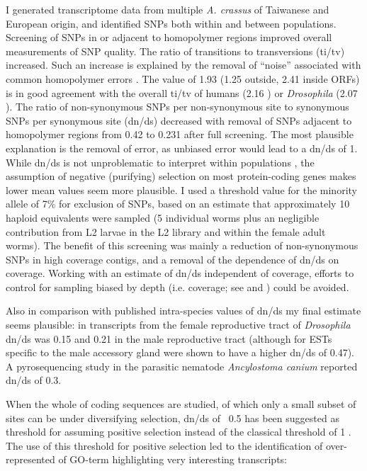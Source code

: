 I generated transcriptome data from multiple \textit{A. crassus} of
Taiwanese and European origin, and identified SNPs both within and
between populations. Screening of SNPs in or adjacent to homopolymer
regions improved overall measurements of SNP quality. The ratio of
transitions to transversions (ti/tv) increased. Such an increase is
explained by the removal of ``noise'' associated with common homopolymer
errors \cite{pmid21685085}. The value of 1.93 (1.25 outside, 2.41
inside ORFs) is in good agreement with the overall ti/tv of humans
(2.16 \cite{pmid21169219}) or \textit{Drosophila} (2.07
\cite{pmid21143862}). The ratio of non-synonymous SNPs per
non-synonymous site to synonymous SNPs per synonymous site (dn/ds)
decreased with removal of SNPs adjacent to homopolymer regions from
0.42 to 0.231 after full screening. The most plausible explanation is
the removal of error, as unbiased error would lead to a dn/ds of
1. While dn/ds is not unproblematic to interpret within populations
\cite{pmid19081788}, the assumption of negative (purifying) selection
on most protein-coding genes makes lower mean values seem more
plausible. I used a threshold value for the minority allele of 7\%
for exclusion of SNPs, based on an estimate that approximately 10
haploid equivalents were sampled (5 individual worms plus an
negligible contribution from L2 larvae in the L2 library and within
the female adult worms). The benefit of this screening was mainly a
reduction of non-synonymous SNPs in high coverage contigs, and a
removal of the dependence of dn/ds on coverage. Working with an
estimate of dn/ds independent of coverage, efforts to control for
sampling biased by depth (i.e. coverage; see \cite{pmid18590545} and
\cite{pmid20478048}) could be avoided.

Also in comparison with published intra-species values of dn/ds my
final estimate seems plausible: in transcripts from the female
reproductive tract of \textit{Drosophila} dn/ds was 0.15
\cite{pmid15579698} and 0.21 in the male reproductive tract
\cite{pmid11404480} (although for ESTs specific to the male accessory
gland were shown to have a higher dn/ds of 0.47). A pyrosequencing
study in the parasitic nematode \textit{Ancylostoma canium}
\cite{pmid20470405} reported dn/ds of 0.3.

When the whole of coding sequences are studied, of which only a small
subset of sites can be under diversifying selection, dn/ds of ~0.5 has
been suggested as threshold for assuming positive selection
\cite{pmid15579698} instead of the classical threshold of 1
\cite{pmid6449605}. The use of this threshold for positive selection
led to the identification of over-represented of GO-term highlighting
very interesting transcripts:

